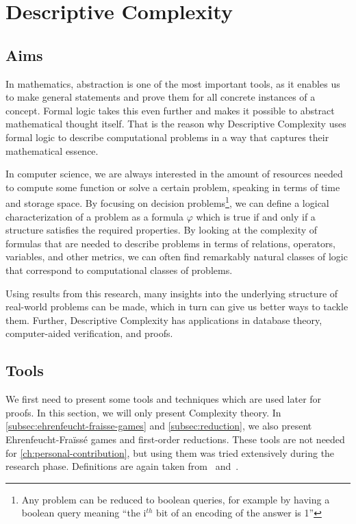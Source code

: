 

\chapter{Descriptive Complexity}\label{ch:descriptive-complexity}


\section{Aims}\label{sec:aims}

In mathematics, abstraction is one of the most important tools, as it enables us to make general statements and prove them for all concrete instances of a concept.
Formal logic takes this even further and makes it possible to abstract mathematical thought itself.
That is the reason why Descriptive Complexity uses formal logic to describe computational problems in a way that captures their mathematical essence.

In computer science, we are always interested in the amount of resources needed to compute some function or solve a certain problem, speaking in terms of time and storage space.
By focusing on decision problems\footnote{Any problem can be reduced to boolean queries, for example by having a boolean query meaning ``the i$^{th}$ bit of an encoding of the answer is 1''}, we can define a logical characterization of a problem as a formula $\varphi$ which is true if and only if a structure satisfies the required properties.
By looking at the complexity of formulas that are needed to describe problems in terms of relations, operators, variables, and other metrics, we can often find remarkably natural classes of logic that correspond to computational classes of problems.

Using results from this research, many insights into the underlying structure of real-world problems can be made, which in turn can give us better ways to tackle them.
Further, Descriptive Complexity has applications in database theory, computer-aided verification, and proofs.


\section{Tools}\label{sec:tools}

We first need to present some tools and techniques which are used later for proofs.
In this section, we will only present Complexity theory.
In \cref{subsec:ehrenfeucht-fraisse-games} and \cref{subsec:reduction}, we also present Ehrenfeucht-Fraïssé games and first-order reductions.
These tools are not needed for \cref{ch:personal-contribution}, but using them was tried extensively during the research phase.
Definitions are again taken from~\cite{theory-cs} and~\cite{descriptive-complexity}.

